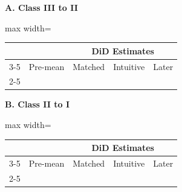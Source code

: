 \documentclass[letterpaper,12pt]{article}
\theoremstyle{definition}
\begin{document}
\begin{table}[t]
\begin{threeparttable}
\begin{minipage}[t]{0.49\textwidth}
\centering\footnotesize
\textbf{A. Class III to II}\par\vspace{2pt}
\begin{adjustbox}{max width=\linewidth}
\begin{tabular}{@{}lcccc@{}}
\toprule
 &  & \multicolumn{3}{c}{DiD Estimates}\\
\cmidrule(lr){3-5}
 & Pre-mean & Matched & Intuitive & Later \\
\cmidrule(lr){2-5}

\bottomrule
\end{tabular}
\end{adjustbox}
\end{minipage}\hfill
\begin{minipage}[t]{0.49\textwidth}
\centering\footnotesize
\textbf{B. Class II to I}\par\vspace{2pt}
\begin{adjustbox}{max width=\linewidth}
\begin{tabular}{@{}lcccc@{}}
\toprule
 &  & \multicolumn{3}{c}{DiD Estimates}\\
\cmidrule(lr){3-5}
 & Pre-mean & Matched & Intuitive & Later \\
\cmidrule(lr){2-5}

\bottomrule
\end{tabular}
\end{adjustbox}
\end{minipage}

\begin{tabular*}{\textwidth}{@{}l@{}}
\end{tabular*}



\end{threeparttable}
\end{table}
\end{document}
